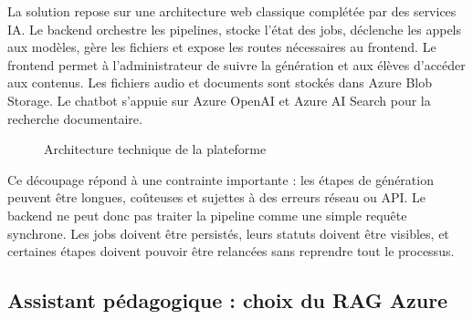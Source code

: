 La solution repose sur une architecture web classique complétée par des services IA. Le
backend orchestre les pipelines, stocke l'état des jobs, déclenche les appels aux modèles,
gère les fichiers et expose les routes nécessaires au frontend. Le frontend permet à
l'administrateur de suivre la génération et aux élèves d'accéder aux contenus. Les fichiers
audio et documents sont stockés dans Azure Blob Storage. Le chatbot s'appuie sur Azure
OpenAI et Azure AI Search pour la recherche documentaire.

\begin{figure}[h]
\centering
{}
\caption{Architecture technique de la plateforme}
\end{figure}

Ce découpage répond à une contrainte importante : les étapes de génération peuvent être
longues, coûteuses et sujettes à des erreurs réseau ou API. Le backend ne peut donc pas
traiter la pipeline comme une simple requête synchrone. Les jobs doivent être persistés,
leurs statuts doivent être visibles, et certaines étapes doivent pouvoir être relancées sans
reprendre tout le processus.

\subsection{Assistant pédagogique : choix du RAG Azure}

